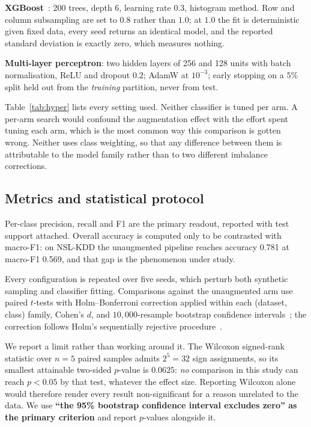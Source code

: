 \documentclass[11pt]{article}
\newcommand{\baseAcc}{0.781}          %
\newcommand{\baseMacroF}{0.569}       %
\begin{document}
\textbf{XGBoost}~\cite{chen2016xgboost}: 200 trees, depth 6, learning rate $0.3$,
histogram method. Row and
column subsampling are set to $0.8$ rather than $1.0$; at $1.0$ the fit is
deterministic given fixed data, every seed returns an identical model, and the
reported standard deviation is exactly zero, which measures nothing.

\textbf{Multi-layer perceptron}: two hidden layers of 256 and 128 units with batch
normalisation, ReLU and dropout $0.2$; AdamW at $10^{-3}$; early stopping on a $5\%$
split held out from the \emph{training} partition, never from test.

Table~\ref{tab:hyper} lists every setting used.
Neither classifier is tuned per arm. A per-arm search would confound the
augmentation effect with the effort spent tuning each arm, which is the most common
way this comparison is gotten wrong. Neither uses class weighting, so that any
difference between them is attributable to the model family rather than to two
different imbalance corrections.

\subsection*{Metrics and statistical protocol}

Per-class precision, recall and F1 are the primary readout, reported with test
support attached. Overall accuracy is computed only to be contrasted with macro-F1:
on NSL-KDD the unaugmented pipeline reaches accuracy \baseAcc{} at macro-F1
\baseMacroF{}, and that gap is the phenomenon under study.

Every configuration is repeated over five seeds, which perturb both synthetic
sampling and classifier fitting. Comparisons against the unaugmented arm use paired
$t$-tests with Holm--Bonferroni correction applied within each (dataset, class)
family, Cohen's $d$, and $10{,}000$-resample bootstrap confidence intervals~\cite{efron1979bootstrap}; the correction follows Holm's sequentially rejective procedure~\cite{holm1979simple}.

We report a limit rather than working around it. The Wilcoxon signed-rank statistic
over $n=5$ paired samples admits $2^5=32$ sign assignments, so its smallest
attainable two-sided $p$-value is $0.0625$: \emph{no} comparison in this study can
reach $p<0.05$ by that test, whatever the effect size. Reporting Wilcoxon alone would
therefore render every result non-significant for a reason unrelated to the data.
We use \textbf{``the 95\% bootstrap confidence interval excludes zero'' as the
primary criterion} and report $p$-values alongside it.
\end{document}
